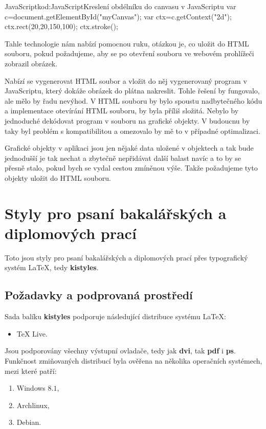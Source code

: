 \documentclass[
  field=inf,
  biblatex,
  glossaries,
  index
]{kidiplom}
\begin{document}
\begin{kicode}{JavaScript}{kod:JavaScript}{Kreslení obdélníku do canvasu v JavaScriptu}
var c=document.getElementById("myCanvas");
var ctx=c.getContext("2d");
ctx.rect(20,20,150,100);
ctx.stroke();
\end{kicode}

Tahle technologie nám nabízí pomocnou ruku, otázkou je, co uložit do HTML souboru, pokud požadujeme, aby se po otevření souboru ve webovém prohlížeči zobrazil obrázek.

Nabízí se vygenerovat HTML soubor a vložit do něj vygenerovaný program v JavaScriptu, který dokáže obrázek do plátna nakreslit. Tohle řešení by fungovalo, ale mělo by řadu nevýhod. V HTML souboru by bylo spoustu nadbytečného kódu a implementace otevírání HTML souboru, by byla příliš složitá. Nebylo by jednoduché dekódovat program v souboru na grafické objekty. V budoucnu by taky byl problém s kompatibilitou a omezovalo by mě to v případné optimalizaci.

Grafické objekty v aplikaci jsou jen nějaké data uložené v objektech a tak bude jednodušší je tak nechat a zbytečně nepřidávat další balast navíc a to by se přesně stalo, pokud bych se vydal cestou zmíněnou výše. Takže požadujeme tyto objekty uložit do HTML souboru. 





\section{Styly pro psaní bakalářských a diplomových prací}
Toto jsou styly pro psaní bakalářských a diplomových prací přes typografický systém \LaTeX{}, tedy \textbf{kistyles}.

\subsection{Požadavky a podprovaná prostředí}
Sada balíku \textbf{kistyles} podporuje následující distribuce systému \LaTeX{}:
\begin{itemize}
\item \TeX{} Live.
\end{itemize}

Jsou podporovány všechny výstupní ovladače, tedy jak \textbf{dvi}, tak \textbf{pdf} i \textbf{ps}. Funkčnost zmiňovaných distribucí byla ověřena na několika operačních systémech, mezi které patří:
\begin{enumerate}
\item Windows $8.1$,
\item Archlinux,
\item Debian.
\end{enumerate}
\end{document}
